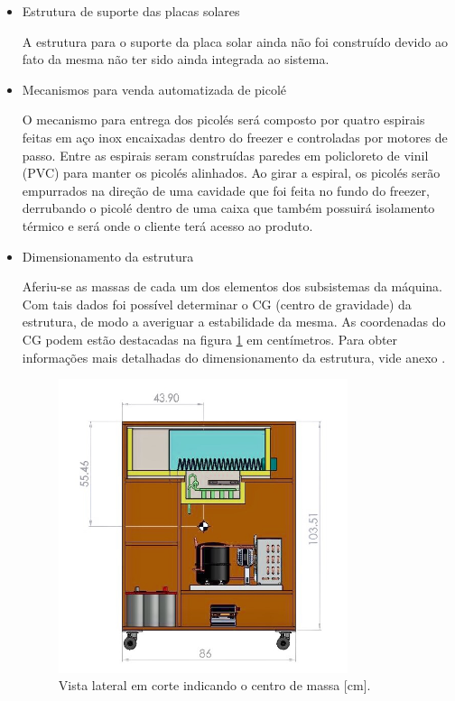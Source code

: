  \begin{itemize}
\item Estrutura de suporte das placas solares

A estrutura para o suporte da placa solar ainda não foi construído devido ao fato da mesma não ter sido ainda integrada ao sistema.
\item Mecanismos para venda automatizada de picolé

O mecanismo para entrega dos picolés será composto por quatro espirais feitas em aço inox encaixadas dentro do freezer e controladas por motores de passo. Entre as espirais seram construídas paredes em policloreto de vinil (PVC) para manter os picolés alinhados. Ao girar a espiral, os picolés serão empurrados na direção de uma cavidade que foi feita no fundo do freezer, derrubando o picolé dentro de uma caixa que também possuirá isolamento térmico e será onde o cliente terá acesso ao produto.
\item Dimensionamento da estrutura 

Aferiu-se as massas de cada um dos elementos dos subsistemas da máquina. Com tais dados foi possível determinar o CG (centro de gravidade) da estrutura, de modo a averiguar a estabilidade da mesma. As coordenadas do CG podem estão destacadas na figura \ref{fig:cad_vista_lateral} em centímetros. Para obter informações mais detalhadas do dimensionamento da estrutura, vide anexo \label{app:visao_explodida}.

   \begin{figure}[H]
	\centering
    \includegraphics[width=0.8\textwidth]{figuras/cad_vista_lateral}
    \caption{Vista lateral em corte indicando o centro de massa [cm].}
    \label{fig:cad_vista_lateral}
\end{figure}



\end{itemize}
